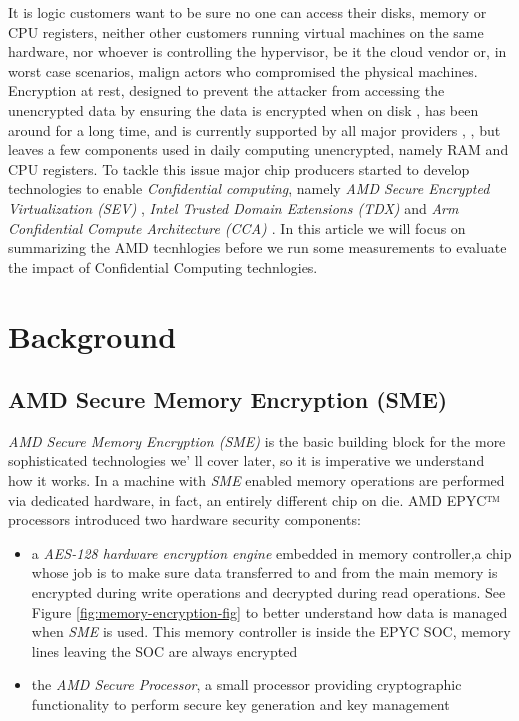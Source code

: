 \documentclass[twocolumn]{article}
\begin{document}
It is logic customers want to be sure no one can access their disks, memory or CPU registers, neither other customers running virtual machines on the same hardware, nor whoever is controlling the hypervisor, be it  the cloud vendor  or, in worst case scenarios, malign actors who compromised the physical machines. Encryption at rest, designed to prevent the attacker from accessing the unencrypted data by ensuring the data is encrypted when on disk \cite{azure-enc}, has been around for a long time, and is currently supported by all major providers \cite{aws-enc}, \cite{gcp-enc}, \cite{azure-enc} but leaves a few components used in daily computing unencrypted, namely RAM and CPU registers. To tackle this issue major chip producers started to develop technologies to enable \textit{Confidential computing}, namely \textit{AMD Secure Encrypted Virtualization (SEV)} \cite{memory-encryption}, \textit{Intel Trusted Domain Extensions (TDX)} \cite{tdx} and \textit{Arm Confidential Compute Architecture (CCA) \cite{cca}}. In this article we will focus on summarizing the AMD tecnhlogies before we run some measurements to evaluate the impact of Confidential Computing technlogies.

\section{Background}
\subsection{AMD Secure Memory Encryption (SME)}

\textit{AMD Secure Memory Encryption (SME)} is the basic building block for the more sophisticated technologies we' ll cover later, so it is imperative we understand how it works. In a machine with \textit{SME} enabled memory operations are performed via dedicated hardware, in fact, an entirely different chip on die. AMD EPYC™ processors introduced two hardware security components:

\begin{itemize}
    \item a \textit{AES-128 hardware encryption engine} embedded in memory controller,a chip whose job is to make sure data transferred to and from the main memory is encrypted during write operations and decrypted during read operations. See Figure \ref{fig:memory-encryption-fig} to better understand how data is managed when \textit{SME} is used. This memory controller is inside the EPYC SOC, memory lines leaving the SOC are always encrypted
    \item the \textit{AMD Secure Processor}, a small processor providing cryptographic functionality to perform secure key generation and key management
\end{itemize}
\end{document}
